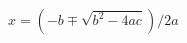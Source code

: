\documentclass[preview]{standalone}
\begin{document}
\begin{center}
$x= (-b \mp \sqrt{b^2 - 4ac})/2a$
\end{center}
\end{document}

